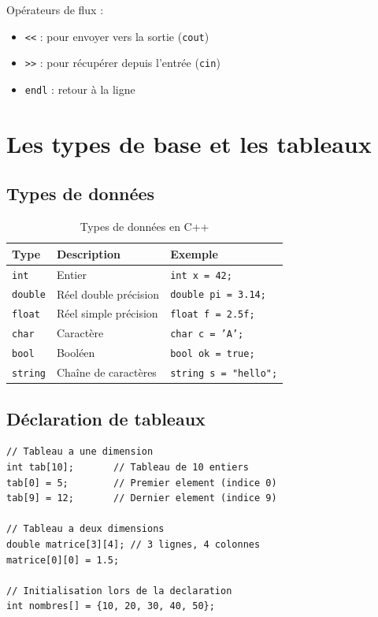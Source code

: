 \documentclass[12pt,a4paper]{article}
\begin{document}
\begin{regle}
Opérateurs de flux :
\begin{itemize}
    \item \texttt{<<} : pour envoyer vers la sortie (\texttt{cout})
    \item \texttt{>>} : pour récupérer depuis l'entrée (\texttt{cin})
    \item \texttt{endl} : retour à la ligne
\end{itemize}
\end{regle}

\section{Les types de base et les tableaux}

\subsection{Types de données}

\begin{table}[h!]
\centering
\caption{Types de données en C++}
\begin{tabular}{lll}
\toprule
\textbf{Type} & \textbf{Description} & \textbf{Exemple} \\
\midrule
\texttt{int} & Entier & \texttt{int x = 42;} \\
\texttt{double} & Réel double précision & \texttt{double pi = 3.14;} \\
\texttt{float} & Réel simple précision & \texttt{float f = 2.5f;} \\
\texttt{char} & Caractère & \texttt{char c = 'A';} \\
\texttt{bool} & Booléen & \texttt{bool ok = true;} \\
\texttt{string} & Chaîne de caractères & \texttt{string s = "hello";} \\
\bottomrule
\end{tabular}
\end{table}

\subsection{Déclaration de tableaux}

\begin{lstlisting}[style=cpp, caption={Tableaux statiques}]
// Tableau a une dimension
int tab[10];       // Tableau de 10 entiers
tab[0] = 5;        // Premier element (indice 0)
tab[9] = 12;       // Dernier element (indice 9)

// Tableau a deux dimensions
double matrice[3][4]; // 3 lignes, 4 colonnes
matrice[0][0] = 1.5;

// Initialisation lors de la declaration
int nombres[] = {10, 20, 30, 40, 50};
\end{lstlisting}
\end{document}
